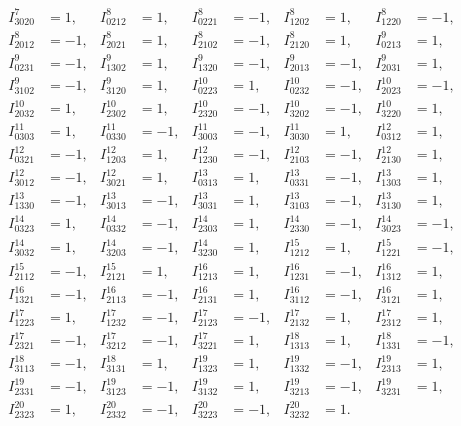 \documentclass[a4paper,12pt, DIV=14, BCOR=5mm, twoside, headsepline, numbers=noenddot]{scrbook}
\begin{document}
\begin{align}
\begin{alignedat}{5}
I^{7}_{3020} &= 1,   &  
I^{8}_{0212} &= 1,       &
I^{8}_{0221} &= -1,   &  
I^{8}_{1202} &= 1,   &  
I^{8}_{1220} &= -1,       \\
I^{8}_{2012} &= -1,   &  
I^{8}_{2021} &= 1,   &  
I^{8}_{2102} &= -1,       &
I^{8}_{2120} &= 1,   &  
I^{9}_{0213} &= 1,   \\  
I^{9}_{0231} &= -1,       &
I^{9}_{1302} &= 1,   &  
I^{9}_{1320} &= -1,   &  
I^{9}_{2013} &= -1,       &
I^{9}_{2031} &= 1,   \\  
I^{9}_{3102} &= -1,   &  
I^{9}_{3120} &= 1,       &
I^{10}_{0223} &= 1,   &  
I^{10}_{0232} &= -1,   &  
I^{10}_{2023} &= -1,       \\
I^{10}_{2032} &= 1,   &  
I^{10}_{2302} &= 1,   &  
I^{10}_{2320} &= -1,       &
I^{10}_{3202} &= -1,   &  
I^{10}_{3220} &= 1,   \\  
I^{11}_{0303} &= 1,       &
I^{11}_{0330} &= -1,   &  
I^{11}_{3003} &= -1,   &  
I^{11}_{3030} &= 1,       &
I^{12}_{0312} &= 1,   \\  
I^{12}_{0321} &= -1,   &  
I^{12}_{1203} &= 1,       &
I^{12}_{1230} &= -1,   &  
I^{12}_{2103} &= -1,   &  
I^{12}_{2130} &= 1,       \\
I^{12}_{3012} &= -1,   &  
I^{12}_{3021} &= 1,   &  
I^{13}_{0313} &= 1,       &
I^{13}_{0331} &= -1,   &  
I^{13}_{1303} &= 1,   \\  
I^{13}_{1330} &= -1,       &
I^{13}_{3013} &= -1,   &  
I^{13}_{3031} &= 1,   &  
I^{13}_{3103} &= -1,       &
I^{13}_{3130} &= 1,   \\  
I^{14}_{0323} &= 1,   &  
I^{14}_{0332} &= -1,       &
I^{14}_{2303} &= 1,   &  
I^{14}_{2330} &= -1,   &  
I^{14}_{3023} &= -1,       \\
I^{14}_{3032} &= 1,   &  
I^{14}_{3203} &= -1,   &  
I^{14}_{3230} &= 1,       &
I^{15}_{1212} &= 1,   &  
I^{15}_{1221} &= -1,   \\  
I^{15}_{2112} &= -1,       &
I^{15}_{2121} &= 1,   &  
I^{16}_{1213} &= 1,   &  
I^{16}_{1231} &= -1,       &
I^{16}_{1312} &= 1,   \\  
I^{16}_{1321} &= -1,   &  
I^{16}_{2113} &= -1,       &
I^{16}_{2131} &= 1,   &  
I^{16}_{3112} &= -1,   &  
I^{16}_{3121} &= 1,       \\
I^{17}_{1223} &= 1,   &  
I^{17}_{1232} &= -1,   &  
I^{17}_{2123} &= -1,       &
I^{17}_{2132} &= 1,   &  
I^{17}_{2312} &= 1,   \\  
I^{17}_{2321} &= -1,       &
I^{17}_{3212} &= -1,   &  
I^{17}_{3221} &= 1,   &  
I^{18}_{1313} &= 1,       &
I^{18}_{1331} &= -1,   \\  
I^{18}_{3113} &= -1,   &  
I^{18}_{3131} &= 1,       &
I^{19}_{1323} &= 1,   &  
I^{19}_{1332} &= -1,   &  
I^{19}_{2313} &= 1,       \\
I^{19}_{2331} &= -1,   &  
I^{19}_{3123} &= -1,   &  
I^{19}_{3132} &= 1,       &
I^{19}_{3213} &= -1,   &  
I^{19}_{3231} &= 1,   \\  
I^{20}_{2323} &= 1,       &
I^{20}_{2332} &= -1,   &  
I^{20}_{3223} &= -1,   &  
I^{20}_{3232} &= 1.   &  
    \end{alignedat}
\end{align}
\end{document}
